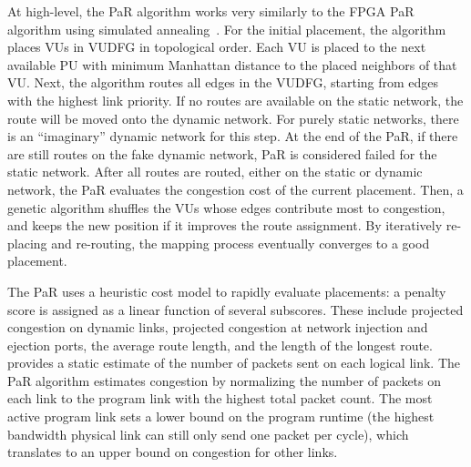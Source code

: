 At high-level, the PaR algorithm works very similarly to the FPGA PaR algorithm using
simulated annealing~\cite{simanneal}. 
For the initial placement, the algorithm places VUs in VUDFG in topological order.
Each VU is placed to the next available PU with minimum Manhattan distance to the placed
neighbors of that VU.
Next, the algorithm routes all edges in the VUDFG, starting from edges with the highest link
priority. If no routes are available on the static network, the route will be moved onto the dynamic
network. For purely static networks, there is an ``imaginary'' dynamic network for this step.
At the end of the PaR, if there are still routes on the fake dynamic network, PaR is considered
failed for the static network.
After all routes are routed, either on the static or dynamic network, the PaR evaluates the
congestion cost of the current placement.
Then, a genetic algorithm shuffles the VUs whose edges contribute most to congestion, 
and keeps the new position if it improves the route assignment.
By iteratively re-placing and re-routing, the mapping process eventually converges to a good placement.

The PaR uses a heuristic cost model to rapidly evaluate placements: a 
penalty score is assigned as a linear function of several subscores.
These include projected congestion on dynamic links, projected congestion at network injection and ejection ports, the average route length, and the length of the longest route.
\name provides a static estimate of the number of packets sent on each logical link.
The PaR algorithm estimates congestion by normalizing the number of packets on each link to the program link with the highest total packet count.
The most active program link sets a lower bound on the program runtime (the highest bandwidth physical link can still only send one packet per cycle), which translates to an upper bound on congestion for other links.


